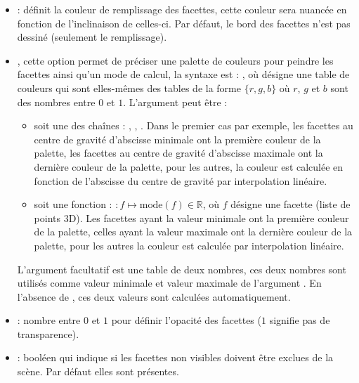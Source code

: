     \begin{itemize}
        \item {} : définit la couleur de remplissage des facettes, cette couleur sera nuancée en fonction de l'inclinaison de celles-ci. Par défaut, le bord des facettes n'est pas dessiné (seulement le remplissage).
        
        \item {}, cette option permet de préciser une palette de couleurs pour peindre les facettes ainsi qu'un mode de calcul, la syntaxe est : , où  désigne une table de couleurs qui sont elles-mêmes des tables de la forme $\{r,g,b\}$ où $r$, $g$ et $b$ sont des nombres entre $0$ et $1$. L'argument   peut être :
            \begin{itemize}
                \item soit une des chaînes : , , . Dans le premier cas par exemple, les facettes au centre de gravité d'abscisse minimale ont la première couleur de la palette, les facettes au centre de gravité d'abscisse maximale ont la dernière couleur de la palette, pour les autres, la couleur est calculée en fonction de l'abscisse du centre de gravité par interpolation linéaire.
                
                \item soit une fonction : $\colon f \mapsto \mathrm{mode}(f)\in\mathbb R$, où $f$ désigne une facette (liste de points 3D). Les facettes ayant la valeur minimale ont la première couleur de la palette, celles ayant la valeur maximale ont la dernière couleur de la palette, pour les autres la couleur est calculée par interpolation linéaire.
            \end{itemize}  
        L'argument facultatif  est une table de deux nombres, ces deux nombres sont utilisés comme valeur minimale et valeur maximale de l'argument . En l'absence de , ces deux valeurs sont calculées automatiquement.
                
        \item {} : nombre entre $0$ et $1$ pour définir l'opacité des facettes ($1$ signifie pas de transparence).
        
        \item {} : booléen qui indique si les facettes non visibles doivent être exclues de la scène. Par défaut elles sont présentes.
        

\end{itemize}
